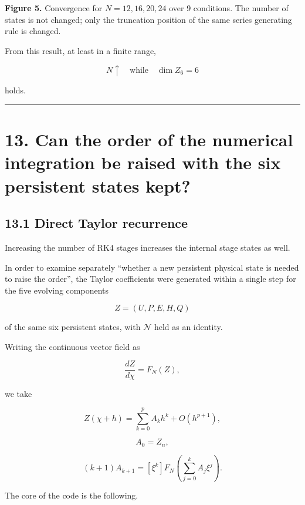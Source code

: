 \documentclass[
  a4paper,
]{article}
\begin{document}
\textbf{Figure 5.} Convergence for \(N=12,16,20,24\) over 9 conditions.
The number of states is not changed; only the truncation position of the
same series generating rule is changed.

From this result, at least in a finite range,

\[
\boxed{
N\uparrow
\quad\text{while}\quad
\dim Z_6=6
}
\]

holds.

\begin{center}\rule{0.5\linewidth}{0.5pt}\end{center}

\section{13. Can the order of the numerical integration be raised with
the six persistent states
kept?}\label{can-the-order-of-the-numerical-integration-be-raised-with-the-six-persistent-states-kept}

\subsection{13.1 Direct Taylor
recurrence}\label{direct-taylor-recurrence}

Increasing the number of RK4 stages increases the internal stage states
as well.

In order to examine separately ``whether a new persistent physical state
is needed to raise the order'', the Taylor coefficients were generated
within a single step for the five evolving components

\[
Z=(U,P,E,H,Q)
\]

of the same six persistent states, with \(\mathcal N\) held as an
identity.

Writing the continuous vector field as

\[
\frac{dZ}{d\chi}=F_N(Z),
\]

we take

\[
Z(\chi+h)
=\sum_{k=0}^{p}A_k h^k+O(h^{p+1}),
\]

\[
A_0=Z_n,
\]

\[
\boxed{
(k+1)A_{k+1}
=[\xi^k]
F_N\!\left(\sum_{j=0}^{k}A_j\xi^j\right).
}
\]

The core of the code is the following.
\end{document}
